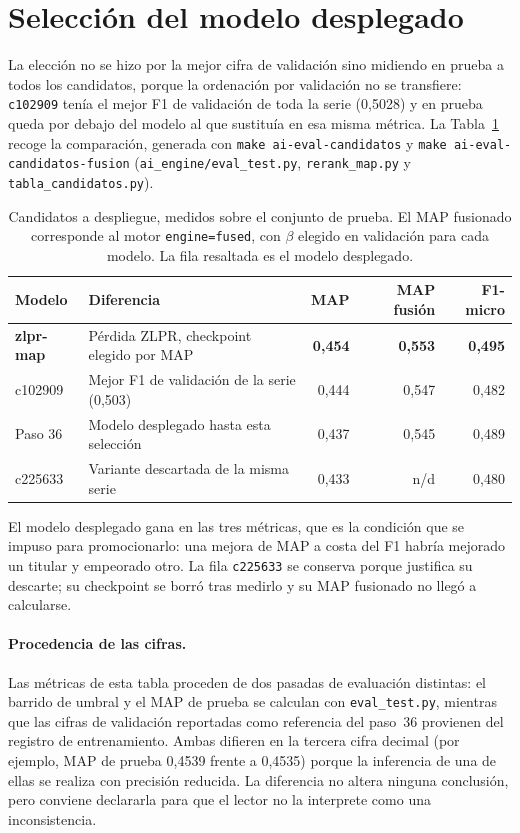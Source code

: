 \section{Selección del modelo desplegado}
\label{sec:anexoH-candidatos}

La elección no se hizo por la mejor cifra de validación sino midiendo en prueba a todos los candidatos, porque la ordenación por validación no se transfiere: \texttt{c102909} tenía el mejor F1 de validación de toda la serie (0,5028) y en prueba queda por debajo del modelo al que sustituía en esa misma métrica. La Tabla~\ref{tab:candidatos} recoge la comparación, generada con \texttt{make ai-eval-candidatos} y \texttt{make ai-eval-candidatos-fusion} (\texttt{ai\_engine/eval\_test.py}, \texttt{rerank\_map.py} y \texttt{tabla\_candidatos.py}).

\begin{table}[h]
\centering
\small
\caption{Candidatos a despliegue, medidos sobre el conjunto de prueba. El MAP fusionado corresponde al motor \texttt{engine=fused}, con $\beta$ elegido en validación para cada modelo. La fila resaltada es el modelo desplegado.}
\label{tab:candidatos}
\begin{tabular}{llrrr}
\hline
\textbf{Modelo} & \textbf{Diferencia} & \textbf{MAP} & \textbf{MAP fusión} & \textbf{F1-micro} \\
\hline
\rowcolor{gray!15}
\textbf{zlpr-map} & Pérdida ZLPR, checkpoint elegido por MAP & \textbf{0{,}454} & \textbf{0{,}553} & \textbf{0{,}495} \\
c102909 & Mejor F1 de validación de la serie (0,503) & 0{,}444 & 0{,}547 & 0{,}482 \\
Paso 36 & Modelo desplegado hasta esta selección & 0{,}437 & 0{,}545 & 0{,}489 \\
c225633 & Variante descartada de la misma serie & 0{,}433 & n/d & 0{,}480 \\
\hline
\end{tabular}

\vspace{2mm}
{\footnotesize El modelo desplegado gana en las tres métricas, que es la condición que se impuso para promocionarlo: una mejora de MAP a costa del F1 habría mejorado un titular y empeorado otro. La fila \texttt{c225633} se conserva porque justifica su descarte; su checkpoint se borró tras medirlo y su MAP fusionado no llegó a calcularse.}
\end{table}

\paragraph{Procedencia de las cifras.} Las métricas de esta tabla proceden de dos pasadas de evaluación distintas: el barrido de umbral y el MAP de prueba se calculan con \texttt{eval\_test.py}, mientras que las cifras de validación reportadas como referencia del paso~36 provienen del registro de entrenamiento. Ambas difieren en la tercera cifra decimal (por ejemplo, MAP de prueba 0,4539 frente a 0,4535) porque la inferencia de una de ellas se realiza con precisión reducida. La diferencia no altera ninguna conclusión, pero conviene declararla para que el lector no la interprete como una inconsistencia.

